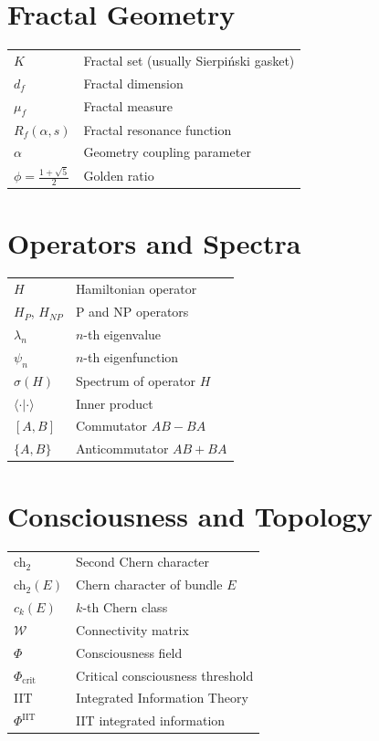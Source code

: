 \section{Fractal Geometry}

\begin{tabular}{ll}
$K$ & Fractal set (usually Sierpiński gasket) \\
$d_f$ & Fractal dimension \\
$\mu_f$ & Fractal measure \\
$R_f(\alpha, s)$ & Fractal resonance function \\
$\alpha$ & Geometry coupling parameter \\
$\phi = \frac{1+\sqrt{5}}{2}$ & Golden ratio \\
\end{tabular}

\section{Operators and Spectra}

\begin{tabular}{ll}
$H$ & Hamiltonian operator \\
$H_P$, $H_{NP}$ & P and NP operators \\
$\lambda_n$ & $n$-th eigenvalue \\
$\psi_n$ & $n$-th eigenfunction \\
$\sigma(H)$ & Spectrum of operator $H$ \\
$\langle \cdot | \cdot \rangle$ & Inner product \\
$[A, B]$ & Commutator $AB - BA$ \\
$\{A, B\}$ & Anticommutator $AB + BA$ \\
\end{tabular}

\section{Consciousness and Topology}

\begin{tabular}{ll}
ch$_2$ & Second Chern character \\
ch$_2(E)$ & Chern character of bundle $E$ \\
$c_k(E)$ & $k$-th Chern class \\
$\mathcal{W}$ & Connectivity matrix \\
$\Phi$ & Consciousness field \\
$\Phi_{\text{crit}}$ & Critical consciousness threshold \\
IIT & Integrated Information Theory \\
$\Phi^{\text{IIT}}$ & IIT integrated information \\
\end{tabular}

